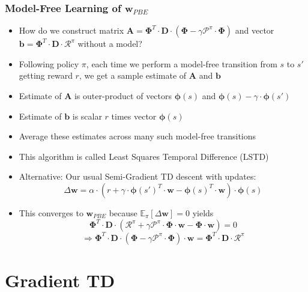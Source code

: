 \documentclass[handout]{beamer}
\newcommand{\bphi}{\bm{\Phi}}
\newcommand{\bd}{\bm{D}}
\newcommand{\bw}{\bm{w}}
\newcommand{\brew}{\bm{\mathcal{R}}^{\pi}}
\newcommand{\bprob}{\bm{\mathcal{P}}^{\pi}}
\begin{document}
\begin{frame}
\frametitle{Model-Free Learning of $\bm{w}_{PBE}$}
\pause
\begin{itemize}[<+->]
\item How do we construct matrix $\bm{A} = \bphi^T \cdot \bd \cdot (\bphi - \gamma \bprob \cdot \bphi)$ and vector $\bm{b} = \bphi^T \cdot \bd \cdot \brew$ without a model?
\item Following policy $\pi$, each time we perform a model-free transition from $s$ to $s'$ getting reward $r$, we get a sample estimate of $\bm{A}$ and $\bm{b}$
\item Estimate of $\bm{A}$ is outer-product of vectors $\bm{\phi}(s)$ and $\bm{\phi}(s) - \gamma \cdot \bm{\phi}(s')$
\item Estimate of $\bm{b}$ is scalar $r$ times vector $\bm{\phi}(s)$ 
\item Average these estimates across many such model-free transitions
\item This algorithm is called Least Squares Temporal Difference (LSTD)
\item Alternative: Our usual Semi-Gradient TD descent with updates:
$$\Delta \bw = \alpha \cdot (r + \gamma \cdot \bm{\phi}(s')^T \cdot \bw - \bm{\phi}(s)^T \cdot \bw) \cdot \bm{\phi}(s)$$
\item This converges to $\bm{w}_{PBE}$ because $\mathbb{E}_{\pi}[\Delta \bw] = 0$ yields
$$ \bphi^T \cdot \bd \cdot (\brew + \gamma \bprob \cdot \bphi \cdot \bw - \bphi \cdot \bw) = 0$$
$$ \Rightarrow \bphi^T \cdot \bd \cdot (\bphi - \gamma \bprob \cdot \bphi) \cdot \bw = \bphi^T \cdot \bd \cdot \brew$$ 
\end{itemize}
\end{frame}




\section{Gradient TD}
\end{document}
